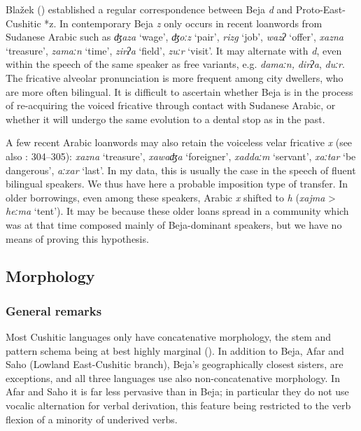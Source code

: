 \documentclass[output=paper]{langsci/langscibook}
\begin{document}
Blažek (\citeyear[130]{Blažek2007}) established a regular correspondence between Beja \textit{d} and Proto-East-Cushitic *z. In contemporary Beja \textit{z} only occurs in recent loanwords from Sudanese Arabic such as \textit{ʤaza} ‘wage’, \textit{ʤoːz} ‘pair’, \textit{rizg} ‘job’, \textit{wazʔ} ‘offer’, \textit{xazna} ‘treasure’, \textit{zamaːn} ‘time’, \textit{zirʔa} ‘field’, \textit{zuːr} ‘visit’. It may alternate with \textit{d}, even within the speech of the same speaker as free variants, e.g. \textit{damaːn,} \textit{dirʔa}, \textit{duːr}. The fricative alveolar pronunciation is more frequent among city dwellers, who are more often bilingual. It is difficult to ascertain whether Beja is in the process of re-acquiring the voiced fricative through contact with Sudanese Arabic, or whether it will undergo the same evolution to a dental stop as in the past.

A few recent Arabic loanwords may also retain the voiceless velar fricative \textit{x} (see also \citealt{ManfrediSimeone-SenelleTosco2015}: 304--305): \textit{xazna} ‘treasure’, \textit{xawaʤa} ‘foreigner’, \textit{xaddaːm} ‘servant’, \textit{xaːtar} ‘be dangerous’, \textit{aːxar} ‘last’. In my data, this is usually the case in the speech of fluent bilingual speakers. We thus have here a probable imposition type of transfer. In older borrowings, even among these speakers, Arabic \textit{x} shifted to \textit{h} (\textit{xajma} > \textit{heːma} ‘tent’). It may be because these older loans spread in a community which was at that time composed mainly of Beja-dominant speakers, but we have no means of proving this hypothesis.


 
 \subsection{Morphology} \label{morphologyv}
 \subsubsection{General remarks}

Most Cushitic languages only have concatenative morphology, the stem and pattern schema being at best highly marginal (\citealt[256]{Cohen1988}). In addition to Beja, Afar and Saho (Lowland East-Cushitic branch), Beja’s geographically closest sisters, are exceptions, and all three languages use also non-concatenative morphology. In Afar and Saho it is far less pervasive than in Beja; in particular they do not use vocalic alternation for verbal derivation, this feature being restricted to the verb flexion of a minority of underived verbs.
\end{document}
